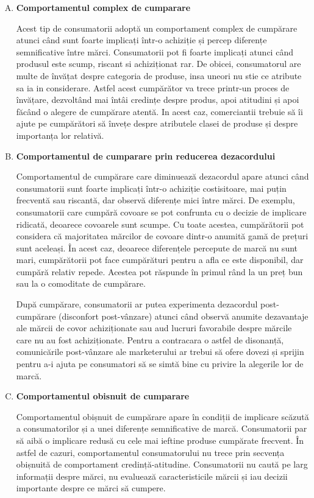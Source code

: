 \documentclass[a4paper, 12pt]{article}
\begin{document}
			\begin{enumerate}[A)]
				\item \textbf{Comportamentul complex de cumparare}
				
				\quad Acest tip de consumatorii adoptă un comportament complex de cumpărare atunci când sunt foarte implicați într-o achiziție și percep diferențe semnificative între mărci. Consumatorii pot fi foarte implicați atunci când produsul este scump, riscant si achiziționat rar. De obicei, consumatorul are multe de învățat despre categoria de produse, insa uneori nu stie ce atribute sa ia in considerare. Astfel acest cumpărător va trece printr-un proces de învățare, dezvoltând mai întâi credințe despre produs, apoi atitudini și apoi făcând o alegere de cumpărare atentă. In acest caz, comerciantii trebuie să îi ajute pe cumpărători să învețe despre atributele clasei de produse și despre importanța lor relativă.
				\item \textbf{Comportamentul de cumparare prin reducerea dezacordului}
				
				\quad Comportamentul de cumpărare care diminuează dezacordul apare atunci când consumatorii sunt foarte implicați într-o achiziție costisitoare, mai puțin frecventă sau riscantă, dar observă diferențe mici între mărci. De exemplu, consumatorii care cumpără covoare se pot confrunta cu o decizie de implicare ridicată, deoarece covoarele sunt scumpe. Cu toate acestea, cumpărătorii pot considera că majoritatea mărcilor de covoare dintr-o anumită gamă de prețuri sunt aceleași. În acest caz, deoarece diferențele percepute de marcă nu sunt mari, cumpărătorii pot face cumpărături pentru a afla ce este disponibil, dar cumpără relativ repede. Acestea pot răspunde în primul rând la un preț bun sau la o comoditate de cumpărare.
				
				\quad După cumpărare, consumatorii ar putea experimenta dezacordul post-cumpărare (disconfort post-vânzare) atunci când observă anumite dezavantaje ale mărcii de covor achiziționate sau aud lucruri favorabile despre mărcile care nu au fost achiziționate. Pentru a contracara o astfel de disonanță, comunicările post-vânzare ale marketerului ar trebui să ofere dovezi și sprijin pentru a-i ajuta pe consumatori să se simtă bine cu privire la alegerile lor de marcă.
				\item \textbf{Comportamentul obisnuit de cumparare}
				
				\quad Comportamentul obișnuit de cumpărare apare în condiții de implicare scăzută a consumatorilor și a unei diferențe semnificative de marcă. Consumatorii par să aibă o implicare redusă cu cele mai ieftine produse cumpărate frecvent. În astfel de cazuri, comportamentul consumatorului nu trece prin secvența obișnuită de comportament credință-atitudine. Consumatorii nu caută pe larg informații despre mărci, nu evaluează caracteristicile mărcii și iau decizii importante despre ce mărci să cumpere.
				

\end{enumerate}
\end{document}
